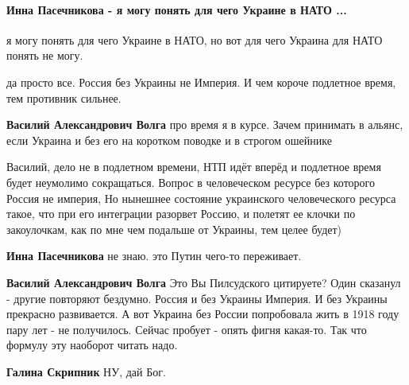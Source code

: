  
 
 
 
 
\paragraph{Инна Пасечникова - я могу понять для чего Украине в НАТО ...}
\label{sec:25_10_2021.fb.volga_vasilii.1.rasterjannost.cmt.pasechnikova.ukraina_nato}

\begin{itemize} %

я могу понять для чего Украине в НАТО, но вот для чего Украина для НАТО понять не могу.

\begin{itemize} %
да просто все. Россия без Украины не Империя. И чем короче подлетное время, тем противник сильнее.

\textbf{Василий Александрович Волга} про время я в курсе. Зачем принимать в альянс, если Украина и без его на коротком поводке и в строгом ошейнике


Василий, дело не в подлетном времени, НТП идёт вперёд и подлетное время будет неумолимо сокращаться.
Вопрос в человеческом ресурсе без которого Россия не империя,
Но нынешнее состояние украинского человеческого ресурса такое, что при его интеграции разорвет Россию, и полетят ее клочки по закоулочкам, как по мне чем подальше от Украины, тем целее будет)

\textbf{Инна Пасечникова} не знаю. это Путин чего-то переживает.

\textbf{Василий Александрович Волга} Это Вы Пилсудского цитируете? Один сказанул - другие повторяют бездумно. Россия и без Украины Империя. И без Украины прекрасно развивается. А вот Украина без России попробовала жить в 1918 году пару лет - не получилось. Сейчас пробует - опять фигня какая-то. Так что формулу эту наоборот читать надо.

\textbf{Галина Скрипник} НУ, дай Бог.
\end{itemize} %


\end{itemize}
